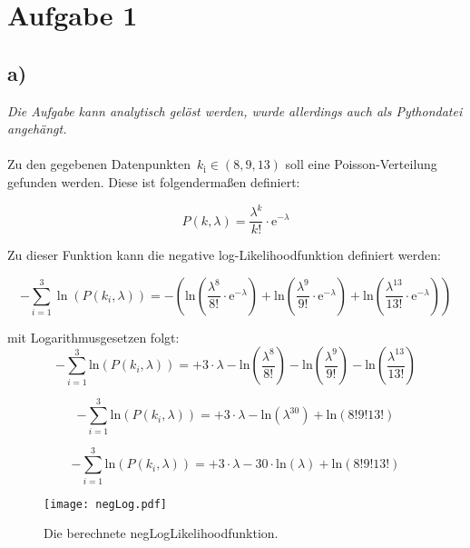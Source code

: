 \section*{Aufgabe 1}
\subsection*{a)}
\textit{Die Aufgabe kann analytisch gelöst werden, wurde allerdings auch als Pythondatei angehängt.} \\~\\
Zu den gegebenen Datenpunkten~$k_\text{i}\in(8,9,13)$ soll eine Poisson-Verteilung gefunden werden. Diese ist folgendermaßen definiert:

\begin{equation*}
P(k, \lambda) = \frac{\lambda^k}{k!}\cdot\mathrm{e}^{-\lambda}
\end{equation*}

Zu dieser Funktion kann die negative log-Likelihoodfunktion definiert werden:

\begin{equation*}
-\sum_{i=1}^3 \mathrm{\ln}(P(k_i,\lambda)) = -( \mathrm{ln}(\frac{\lambda^8}{8!}\cdot\mathrm{e}^{-\lambda})+
\mathrm{ln}(\frac{\lambda^9}{9!}\cdot\mathrm{e}^{-\lambda})+
\mathrm{ln}(\frac{\lambda^{13}}{13!}\cdot\mathrm{e}^{-\lambda}))
\end{equation*}

mit Logarithmusgesetzen folgt:
\begin{equation*}
-\sum_{i=1}^3 \mathrm{ln}(P(k_i,\lambda)) = +3\cdot\lambda -\mathrm{ln}\left(\frac{\lambda^8}{8!}\right)-\mathrm{ln}\left(\frac{\lambda^9}{9!}\right) -\mathrm{ln}\left(\frac{\lambda^{13}}{13!}\right)
\end{equation*}

\begin{equation*}
-\sum_{i=1}^3 \mathrm{ln}(P(k_i,\lambda)) = +3\cdot\lambda -\mathrm{ln}(\lambda^{30})+\mathrm{ln}(8!9!13!)
\end{equation*}

\begin{equation*}
-\sum_{i=1}^3 \mathrm{ln}(P(k_i,\lambda)) = +3\cdot\lambda -30\cdot\mathrm{ln}(\lambda)+\mathrm{ln}(8!9!13!)
\end{equation*}

\begin{figure}[H]
  \centering
  \texttt{[image: negLog.pdf]}
  \caption{Die berechnete negLogLikelihoodfunktion.}
\end{figure}

